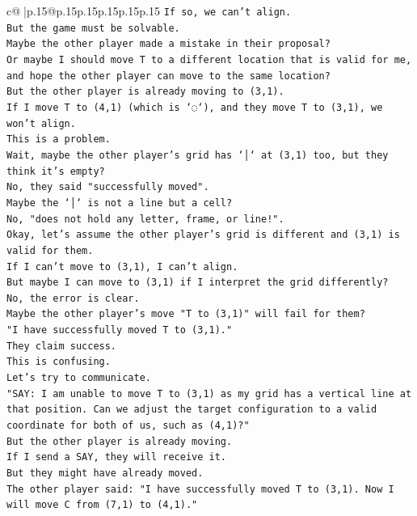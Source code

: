\documentclass{article}
\begin{document}
{\begin{supertabular}{c@{$\;$}|p{.15\linewidth}@{}p{.15\linewidth}p{.15\linewidth}p{.15\linewidth}p{.15\linewidth}p{.15\linewidth}}
{{{\texttt{If so, we can't align.} \\
\texttt{But the game must be solvable.} \\
\texttt{Maybe the other player made a mistake in their proposal?} \\
\texttt{Or maybe I should move T to a different location that is valid for me, and hope the other player can move to the same location?} \\
\texttt{But the other player is already moving to (3,1).} \\
\texttt{If I move T to (4,1) (which is `◌`), and they move T to (3,1), we won't align.} \\
\texttt{This is a problem.} \\
\texttt{Wait, maybe the other player's grid has `│` at (3,1) too, but they think it's empty?} \\
\texttt{No, they said "successfully moved".} \\
\texttt{Maybe the `│` is not a line but a cell?} \\
\texttt{No, "does not hold any letter, frame, or line!".} \\
\texttt{Okay, let's assume the other player's grid is different and (3,1) is valid for them.} \\
\texttt{If I can't move to (3,1), I can't align.} \\
\texttt{But maybe I can move to (3,1) if I interpret the grid differently?} \\
\texttt{No, the error is clear.} \\
\texttt{Maybe the other player's move "T to (3,1)" will fail for them?} \\
\texttt{"I have successfully moved T to (3,1)."} \\
\texttt{They claim success.} \\
\texttt{This is confusing.} \\
\texttt{Let's try to communicate.} \\
\texttt{"SAY: I am unable to move T to (3,1) as my grid has a vertical line at that position. Can we adjust the target configuration to a valid coordinate for both of us, such as (4,1)?"} \\
\texttt{But the other player is already moving.} \\
\texttt{If I send a SAY, they will receive it.} \\
\texttt{But they might have already moved.} \\
\texttt{The other player said: "I have successfully moved T to (3,1). Now I will move C from (7,1) to (4,1)."} \\
}}}
\end{supertabular}}
\end{document}
